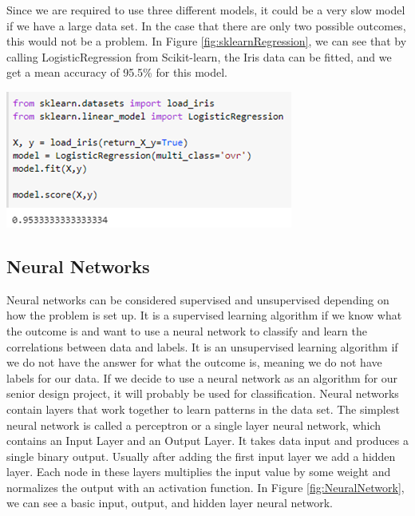 \documentclass[a4paper,12pt]{report}
\begin{document}
Since we are required to use three different models, it could be a very slow model if we have a large data set. In the case that there are only two possible outcomes, this would not be a problem. In Figure \ref{fig:sklearnRegression}, we can see that by calling LogisticRegression from Scikit-learn, the Iris data can be fitted, and we get a mean accuracy of 95.5\% for this model.

\begin{center}
    \captionsetup{type=figure}
    \includegraphics[width=.5\linewidth]{media/sklearnRegression.png}
    \label{fig:sklearnRegression}
\end{center}

\subsection{Neural Networks}

Neural networks can be considered supervised and unsupervised depending on how the problem is set up. It is a supervised learning algorithm if we know what the outcome is and want to use a neural network to classify and learn the correlations between data and labels. It is an unsupervised learning algorithm if we do not have the answer for what the outcome is, meaning we do not have labels for our data. If we decide to use a neural network as an algorithm for our senior design project, it will probably be used for classification. Neural networks contain layers that work together to learn patterns in the data set. The simplest neural network is called a perceptron or a single layer neural network, which contains an Input Layer and an Output Layer. It takes data input and produces a single binary output. Usually after adding the first input layer we add a hidden layer. Each node in these layers multiplies the input value by some weight and normalizes the output with an activation function. In Figure \ref{fig:NeuralNetwork}, we can see a basic input, output, and hidden layer neural network. 
\end{document}
